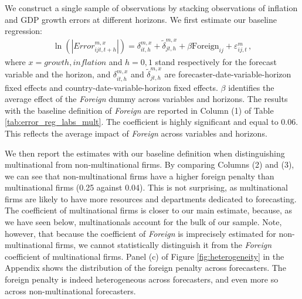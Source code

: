 We construct a single sample of observations by stacking observations of inflation and GDP growth errors at different horizons. We first estimate our baseline regression:
\begin{align}
	\ln(|Error_{ijt,t+h}^{m,x}|)= \delta_{it,h}^{m,x} +\tilde\delta_{jt,h}^{m,x} +  \beta \text{Foreign}_{ij} +\varepsilon_{ij,t}^m  \,, \label{eq:main}
\end{align}
where $x=growth, inflation$ and $h=0,1$ stand respectively for the forecast variable and the horizon, and $ \delta_{it,h}^{m,x}$ and $\tilde\delta_{jt,h}^{m,x}$ are forecaster-date-variable-horizon fixed effects and country-date-variable-horizon fixed effects. $\beta$ identifies the average effect of the \textit{Foreign} dummy across variables and horizons. The results with the baseline definition of \textit{Foreign} are reported in Column (1) of Table \ref{tab:error_reg_labs_mult}. The coefficient is highly significant and equal to 0.06. This reflects the average impact of \textit{Foreign} across variables and horizons.

We then report the estimates with our baseline definition when distinguishing multinational from non-multinational firms. By comparing Columns (2) and (3), we can see that non-multinational firms have a higher foreign penalty than multinational firms (0.25 against 0.04). This is not surprising, as multinational firms are likely to have more resources and departments dedicated to forecasting. The coefficient of multinational firms is closer to our main estimate, because, as we have seen below, multinationals account for the bulk of our sample. Note, however, that because the coefficient of \textit{Foreign} is imprecisely estimated for non-multinational firms, we cannot statistically distinguish it from the \textit{Foreign} coefficient of multinational firms. Panel (c) of Figure \ref{fig:heterogeneity} in the Appendix shows the distribution of the foreign penalty across forecasters. The foreign penalty is indeed heterogeneous across forecasters, and even more so across non-multinational forecasters.

